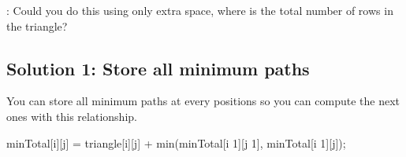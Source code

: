 \documentclass[letterpaper,12pt,english]{book}
\begin{document}
\sphinxAtStartPar
{}: Could you do this using only  extra space, where  is the total number of rows in the triangle?


\subsection{Solution 1: Store all minimum paths}
\label{\detokenize{Dynamic_Programming/05_DP_120_Triangle:solution-1-store-all-minimum-paths}}
\sphinxAtStartPar
You can store all minimum paths at every positions  so you can compute the next ones with this relationship.

\begin{sphinxVerbatim}[commandchars=\\\{\}]
minTotal[i][j] = triangle[i][j] + min(minTotal[i \PYGZhy{} 1][j \PYGZhy{} 1], minTotal[i \PYGZhy{} 1][j]);
\end{sphinxVerbatim}
\end{document}
